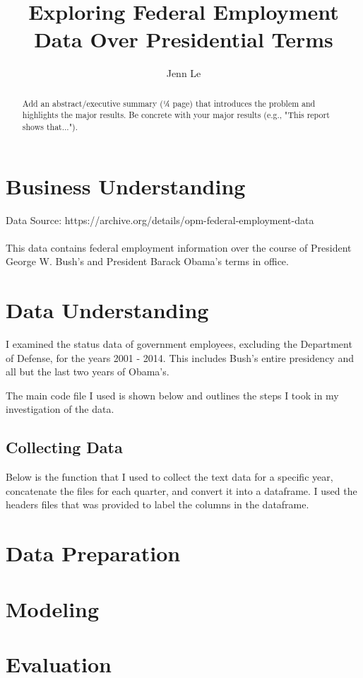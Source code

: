 \documentclass[12pt]{article}
\title{Exploring Federal Employment Data Over Presidential Terms}
\author{Jenn Le}
\begin{document}
  \maketitle

  \thispagestyle{empty}

  \begin{abstract}

    Add an abstract/executive summary (¼ page) that introduces the problem and
    highlights the major results. Be concrete with your major results (e.g., "This
    report shows that...").

  \end{abstract}

  \clearpage

  \tableofcontents
  \pagebreak

  \section{Business Understanding}
    Data Source: https://archive.org/details/opm-federal-employment-data
    \\
    \\
    This data contains federal employment information over the course of President
    George W. Bush's and President Barack Obama's terms in office.

  \section{Data Understanding}

    I examined the status data of government employees, excluding the Department
    of Defense, for the years 2001 - 2014. This includes Bush's entire presidency
    and all but the last two years of Obama's.

    The main code file I used is shown below and outlines the steps I took in my
    investigation of the data.
    \\
    

    \subsection{Collecting Data}
      Below is the function that I used to collect the text data for a specific year,
      concatenate the files for each quarter, and convert it into a dataframe. I
      used the headers files that was provided to label the columns in the dataframe.
      \\
      

  \section{Data Preparation}

  \section{Modeling}

  \section{Evaluation}
\end{document}
